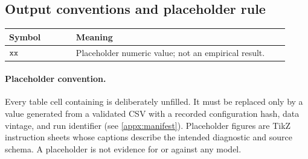 \subsection{Output conventions and placeholder rule}

\begin{longtable}{p{0.22\linewidth}p{0.70\linewidth}}
\toprule
Symbol & Meaning \\
\midrule
\endhead
\(\xx\) & Placeholder numeric value; not an empirical result. \\
\bottomrule
\end{longtable}

\paragraph{Placeholder convention.}
Every table cell containing \xx{} is deliberately unfilled. It must be replaced
only by a value generated from a validated CSV with a recorded configuration
hash, data vintage, and run identifier (see \cref{appx:manifest}).
Placeholder figures are TikZ instruction sheets whose captions describe the
intended diagnostic and source schema. A placeholder is not evidence for or
against any model.

